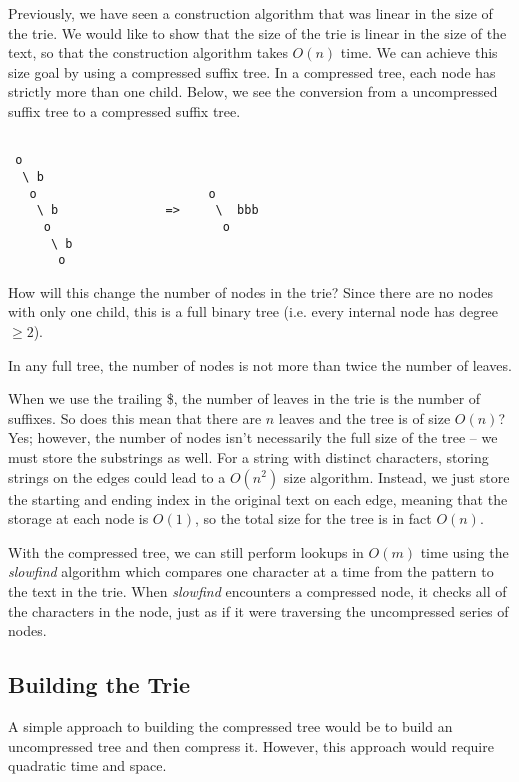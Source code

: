 \documentclass{article}
\begin{document}
Previously, we have seen a construction algorithm that was linear in
the size of the trie.  We would like to show that the size of the trie
is linear in the size of the text, so that the construction algorithm
takes $O(n)$ time.  We can achieve this size goal by using a
compressed suffix tree.  In a compressed tree, each node has strictly
more than one child.  Below, we see the conversion from a uncompressed
suffix tree to a compressed suffix tree.

\begin{verbatim}

 o
  \ b
   o                        o
    \ b               =>     \  bbb
     o                        o
      \ b
       o
\end{verbatim}

How will this change the number of nodes in the trie?  Since there are
no nodes with only one child, this is a full binary tree (i.e. every
internal node has degree $\geq 2$).

\begin{lemma}
In any full tree, the number of nodes is not more than twice the number
of leaves.
\end{lemma}

When we use the trailing \$, the number of leaves in the trie is the
number of suffixes.  So does this mean that there are $n$ leaves and
the tree is of size $O(n)$?  Yes; however, the number of nodes isn't
necessarily the full size of the tree -- we must store the substrings
as well.  For a string with distinct characters, storing strings on
the edges could lead to a $O(n^2)$ size algorithm.  Instead, we just
store the starting and ending index in the original text on each edge,
meaning that the storage at each node is $O(1)$, so the total size for
the tree is in fact $O(n)$.

With the compressed tree, we can still perform lookups in $O(m)$ time
using the \emph{slowfind} algorithm which compares one character at a
time from the pattern to the text in the trie.  When \emph{slowfind}
encounters a compressed node, it checks all of the characters in the
node, just as if it were traversing the uncompressed series of nodes.

\subsection{Building the Trie}

A simple approach to building the compressed tree would be to build an
uncompressed tree and then compress it.  However, this approach would
require quadratic time and space.
\end{document}
